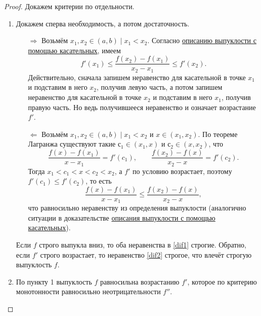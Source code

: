 \begin{proof}
	Докажем критерии по отдельности.
	\begin{enumerate}
		\item Докажем сперва необходимость, а потом достаточность.
		\begin{enumerate}
			\item[\(\Rightarrow\)] \label{dif}Возьмём \(x_1, x_2 \in (a, b) \mid x_1 < x_2\). Согласно \hyperlink{vypkas}{описанию выпуклости с помощью касательных}, имеем
			\begin{equation}
				\label{dif1}
				f'(x_1) \leqslant \frac{f(x_2) - f(x_1)}{x_2 - x_1} \leqslant f'(x_2).
			\end{equation}
			Действительно, сначала запишем неравенство для касательной в точке \(x_1\) и подставим в него \(x_2\), получив левую часть, а потом запишем неравенство для касательной в точке \(x_2\) и подставим в него \(x_1\), получив правую часть. Но ведь получившееся неравенство и означает возрастание \(f'\).
			\item[\(\Leftarrow\)] Возьмём \(x_1, x_2 \in (a, b) \mid x_1 < x_2\) и \(x \in (x_1, x_2)\). По теореме Лагранжа существуют такие \(с_1 \in (x_1, x)\) и \(с_2 \in (x, x_2)\), что \[
				\frac{f(x) - f(x_1)}{x - x_1} = f'(c_1), \qquad \frac{f(x_2) - f(x)}{x_2 - x} = f'(c_2).
			\]
			Тогда \(x_1 < c_1 < x < c_2 < x_2\), а \(f'\) по условию возрастает, поэтому \(f'(c_1) \leqslant f'(c_2)\), то есть
			\begin{equation}
				\label{dif2}
				\frac{f(x) - f(x_1)}{x - x_1} \leqslant \frac{f(x_2) - f(x)}{x_2 - x},	
			\end{equation}
			что равносильно неравенству из определения выпуклости (аналогично ситуации в доказательстве \hyperlink{vypkas}{описания выпуклости с помощью касательных}).
		\end{enumerate}
		
		Если \(f\) строго выпукла вниз, то оба неравенства в \eqref{dif1} строгие. Обратно, если \(f'\) строго возрастает, то неравенство \eqref{dif2} строгое, что влечёт строгую выпуклость \(f\).
		
		\item По пункту 1 выпуклость \(f\) равносильна возрастанию \(f'\), которое по критерию монотонности равносильно неотрицательности \(f''\).
	\end{enumerate}
\end{proof}





